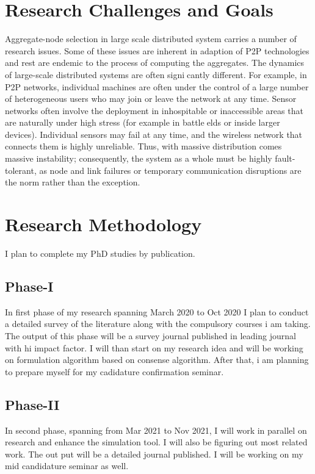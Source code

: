 \documentclass[10pt]{llncs}
\begin{document}
%
\section{Research Challenges and Goals}
Aggregate-node selection in large scale distributed system carries a number of research issues.
Some of these issues are inherent in adaption of P2P technologies and rest are endemic to the
process of computing the aggregates. The dynamics of large-scale distributed systems are
often signicantly different. For example, in P2P networks, individual machines are often
under the control of a large number of heterogeneous users who may join or leave the network
at any time. Sensor networks often involve the deployment in inhospitable or inaccessible
areas that are naturally under high stress (for example in battleelds or inside larger devices).
Individual sensors may fail at any time, and the wireless network that connects them is
highly unreliable. Thus, with massive distribution comes massive instability; consequently,
the system as a whole must be highly fault-tolerant, as node and link failures or temporary
communication disruptions are the norm rather than the exception.

%
\section{Research Methodology}
I plan to complete my PhD studies by publication.
\subsection{Phase-I}
In first phase of my research spanning March 2020 to Oct 2020 I plan to conduct a detailed survey of the literature along with the compulsory courses i am taking. The output of this phase will be a survey journal published in leading journal with hi impact factor. I will than start on my research idea and will be working on formulation algorithm based on consense algorithm. After that, i am planning to prepare myself for my cadidature confirmation seminar.

%
\subsection{Phase-II}
In second phase, spanning from Mar 2021 to Nov 2021, I will work in parallel on research and enhance the simulation tool. I will also be figuring out most related work. The out put will be a detailed journal published. I will be working on my mid candidature seminar as well.
\end{document}
